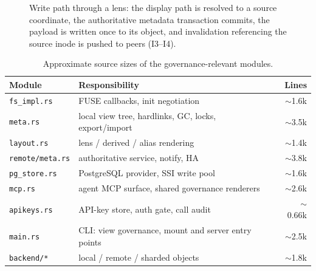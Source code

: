 \documentclass[numberedsection,acmtos]{acmart}
\begin{document}
\begin{figure}[t]
\centering
{}
\caption{Write path through a lens: the display path is resolved to a source
coordinate, the authoritative metadata transaction commits, the payload is
written once to its object, and invalidation referencing the source inode is
pushed to peers (I3--I4).}
\label{fig:writepath}
\end{figure}

\begin{table}[t]
\caption{Approximate source sizes of the governance-relevant modules.}
\label{tab:loc}
\begin{tabular}{llr}
\toprule
Module & Responsibility & Lines \\
\midrule
\texttt{fs\_impl.rs}   & FUSE callbacks, init negotiation & $\sim$1.6k \\
\texttt{meta.rs}       & local view tree, hardlinks, GC, locks, export/import & $\sim$3.5k \\
\texttt{layout.rs}     & lens / derived / alias rendering & $\sim$1.4k \\
\texttt{remote/meta.rs}& authoritative service, notify, HA & $\sim$3.8k \\
\texttt{pg\_store.rs}   & PostgreSQL provider, SSI write pool & $\sim$1.6k \\
\texttt{mcp.rs}        & agent MCP surface, shared governance renderers & $\sim$2.6k \\
\texttt{apikeys.rs}    & API-key store, auth gate, call audit & $\sim$0.66k \\
\texttt{main.rs}       & CLI: view governance, mount and server entry points & $\sim$2.5k \\
\texttt{backend/*}     & local / remote / sharded objects & $\sim$1.8k \\
\bottomrule
\end{tabular}
\end{table}
\end{document}
